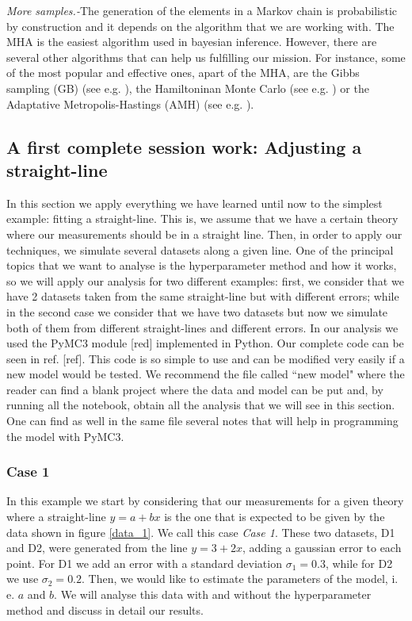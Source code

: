 \documentclass[onecolumn,           %
               showpacs,            %
               preprintnumbers,     %
               aps,                 %
               letterpaper,             %
               superscriptaddress,      %
               nofootinbib,         %
               tightenlines,        %
               floats,floatfix      %
               ,usenatbib,
               ]{revtex4-1}
\begin{document}
\textit{More samples.-}The generation of the elements in a Markov chain is probabilistic by construction and it depends on the algorithm that we are working with. The MHA is the easiest algorithm used in bayesian inference. However, there are several other algorithms that can help us fulfilling our mission. For instance, some of the most popular and effective ones, apart of the MHA, are the Gibbs sampling (GB) (see e.g. \cite{gibbs1,gibbs2}), the Hamiltoninan Monte Carlo (see e.g. \cite{hamiltonian1,Hamiltonian2}) or the Adaptative Metropolis-Hastings (AMH) (see e.g. \cite{importance}).\\
 
 \subsection{A first complete session work: Adjusting a straight-line}

In this section we apply everything we have learned until now to the simplest example: fitting a straight-line. This is, we assume that we have a certain theory where our measurements should be in a straight line. Then, in order to apply our techniques, we simulate several datasets along a given line. One of the principal topics that we want to analyse is the hyperparameter method and how it works, so we will apply our analysis for two different examples: first, we consider that we have 2 datasets taken from the same straight-line but with different errors; while in the second case we consider that we have two datasets but now we simulate both of them from different straight-lines and different errors. In our analysis we used the PyMC3 module [red] implemented in Python. Our complete code can be seen in ref. [ref]. This code is so simple to use and can be modified very easily if a new model would be tested. We recommend the file called ``new model" where the reader can find a blank project where the data and model can be put and, by running all the notebook, obtain all the analysis that we will see in this section. One can find as well in the same file several notes that will help in programming the model with PyMC3. 

\subsubsection{Case 1}

In this example we start by considering that our measurements for a given theory where a straight-line $y=a+bx$ is the one that is expected to be given by the data shown in figure \ref{data_1}. We call this case \textit{Case 1}. These two datasets, D1 and D2, were generated from the line $y=3+2x$, adding a gaussian error to each point. For D1 we add an error with a standard deviation $\sigma_1 = 0.3$, while for D2 we use $\sigma_2 = 0.2$. Then, we would like to estimate the parameters of the model, i. e. $a$ and $b$. We will analyse this data with and without the hyperparameter method and discuss in detail our results.
\end{document}
